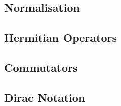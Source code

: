 \subsection{Normalisation}
\subsection{Hermitian Operators}
\subsection{Commutators}
\subsection{Dirac Notation}